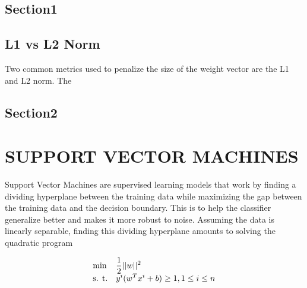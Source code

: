 \documentclass[a4paper,twoside]{article}
\begin{document}
\subsection{Section1}




\subsection{L1 vs L2 Norm}

Two common metrics used to penalize the size of the weight vector are the L1 and L2 norm. The 


\subsection{Section2}




\section{\uppercase{Support Vector Machines}}

Support Vector Machines are supervised learning models that work by finding a dividing hyperplane between the training data while maximizing the gap between the training data and the decision boundary. This is to help the classifier generalize better and makes it more robust to noise. Assuming the data is linearly separable, finding this dividing hyperplane amounts to solving the quadratic program



\begin{equation}
\begin{array}{ll@{}ll}
\text{min}  & \displaystyle \frac{1}{2} ||w||^2 &\\
\text{s. t.}& \displaystyle y^i(w^T x^i + b) \geq 1 , 1 \leq i \leq n
\end{array}
\end{equation}
\end{document}
